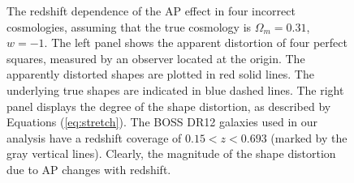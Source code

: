 \documentclass[iop]{emulateapj}
\begin{document}
\begin{figure}
   \caption{\label{fig_xy}
   The redshift dependence of the AP effect in four incorrect cosmologies,
   assuming that the true cosmology is $\Omega_m=0.31$, $w=-1$.
   The left panel shows the apparent distortion of four perfect squares,
   measured by an observer located at the origin.
   The apparently distorted shapes are plotted in red solid lines.
   The underlying true shapes are indicated in blue dashed lines.
   The right panel displays the degree of the shape distortion, as described by Equations (\ref{eq:stretch}).
   The BOSS DR12 galaxies used in our analysis have a redshift coverage of $0.15 < z < 0.693$ (marked 
   by the gray vertical lines). Clearly, the magnitude of the shape distortion due to AP changes with redshift.
   }
\end{figure}
\end{document}
